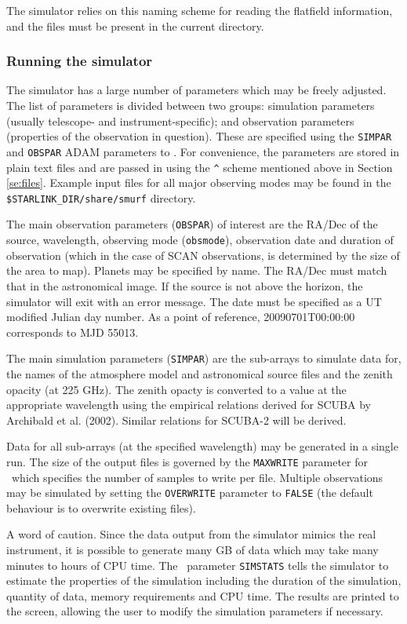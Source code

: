 \documentclass[oneside,11pt]{starlink}
\begin{document}
The simulator relies on this naming scheme for reading the flatfield
information, and the files must be present in the current directory.

\subsubsection{Running the simulator}

The simulator has a large number of parameters which may be freely
adjusted. The list of parameters is divided between two groups:
simulation parameters (usually telescope- and instrument-specific); and
observation parameters (properties of the observation in
question). These are specified using the \texttt{SIMPAR} and
\texttt{OBSPAR} ADAM parameters to \sctwosim. For convenience, the
parameters are stored in plain text files and are passed in using the
\verb+^+ scheme mentioned above in Section \ref{se:files}. Example
input files for all major observing modes may be found in the
\texttt{\$STARLINK\_DIR/share/smurf} directory.

The main observation parameters (\texttt{OBSPAR}) of interest are the
RA/Dec of the source, wavelength, observing mode (\texttt{obsmode}),
observation date and duration of observation (which in the case of
SCAN observations, is determined by the size of the area to
map). Planets may be specified by name. The RA/Dec must match that in
the astronomical image. If the source is not above the horizon, the
simulator will exit with an error message. The date must be specified
as a UT modified Julian day number. As a point of reference,
20090701T00:00:00 corresponds to MJD 55013.

The main simulation parameters (\texttt{SIMPAR}) are the sub-arrays to
simulate data for, the names of the atmosphere model and astronomical
source files and the zenith opacity (at 225 GHz). The zenith opacty is
converted to a value at the appropriate wavelength using the empirical
relations derived for SCUBA by Archibald et al. (2002). Similar
relations for SCUBA-2 will be derived.

Data for all sub-arrays (at the specified wavelength) may be generated
in a single run. The size of the output files is governed by the
\texttt{MAXWRITE} parameter for \sctwosim\ which specifies the number
of samples to write per file. Multiple observations may be simulated
by setting the \texttt{OVERWRITE} parameter to \texttt{FALSE} (the
default behaviour is to overwrite existing files).

A word of caution. Since the data output from the simulator mimics the
real instrument, it is possible to generate many GB of data which may
take many minutes to hours of CPU time. The \sctwosim\ parameter
\texttt{SIMSTATS} tells the simulator to estimate the properties of
the simulation including the duration of the simulation, quantity of
data, memory requirements and CPU time. The results are printed to the
screen, allowing the user to modify the simulation parameters if
necessary.
\end{document}
